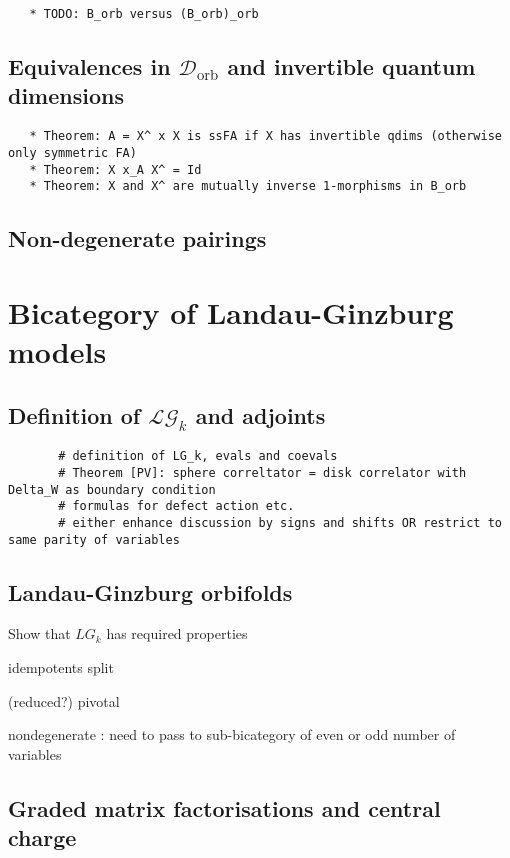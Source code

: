 \documentclass[12pt]{scrartcl}
\theoremstyle{definition}
\numberwithin{equation}{section}
\numberwithin{definition}{section}
\numberwithin{figure}{section}
\begin{document}
\begin{verbatim}
   * TODO: B_orb versus (B_orb)_orb
\end{verbatim}

\subsection{Equivalences in $\mathcal{D}_\mathrm{orb}$ and invertible quantum dimensions}

\begin{verbatim}
   * Theorem: A = X^ x X is ssFA if X has invertible qdims (otherwise only symmetric FA)
   * Theorem: X x_A X^ = Id
   * Theorem: X and X^ are mutually inverse 1-morphisms in B_orb
\end{verbatim}

\subsection{Non-degenerate pairings}


\section{Bicategory of Landau-Ginzburg models}

\subsection{Definition of $\mathcal{LG}_k$ and adjoints}

\begin{verbatim}
       # definition of LG_k, evals and coevals
       # Theorem [PV]: sphere correltator = disk correlator with Delta_W as boundary condition 
       # formulas for defect action etc. 
       # either enhance discussion by signs and shifts OR restrict to same parity of variables
\end{verbatim}

\subsection{Landau-Ginzburg orbifolds}

Show that $LG_k$ has required properties

idempotents split

(reduced?) pivotal

nondegenerate : need to pass to sub-bicategory of even or odd number of variables
       
\subsection{Graded matrix factorisations and central charge}
\end{document}
